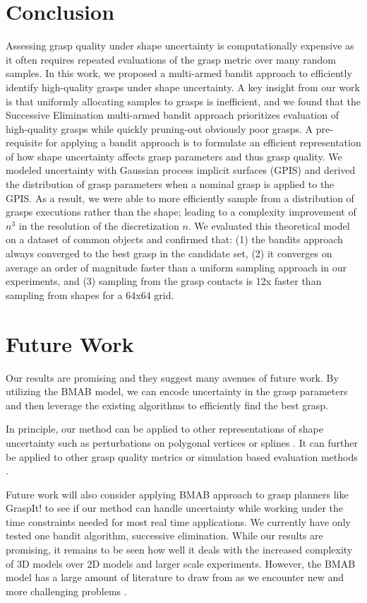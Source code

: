 \documentclass[letterpaper, 10 pt, conference]{ieeeconf}  %
\begin{document}
\section{Conclusion}
Assessing grasp quality under shape uncertainty is computationally expensive as it often requires repeated evaluations of the grasp metric over many random samples.
In this work, we proposed a multi-armed bandit approach to efficiently identify high-quality grasps under shape uncertainty. 
A key insight from our work is that uniformly allocating samples to grasps is inefficient, and
 we found that the Successive Elimination multi-armed bandit approach prioritizes evaluation of high-quality grasps while quickly pruning-out obviously poor grasps.
A pre-requisite for applying a bandit approach is to formulate an efficient representation of how shape uncertainty affects grasp parameters and thus grasp quality.
We modeled uncertainty with Gaussian process implicit surfaces (GPIS) and derived the distribution of grasp parameters when a nominal grasp is applied to the GPIS.
As a result, we were able to more efficiently sample from a distribution of grasps executions rather than the shape; leading to a complexity improvement of $n^3$ in the resolution of the discretization $n$.
We evaluated this theoretical model on a dataset of common objects and confirmed that: (1) the bandits approach always converged to the best grasp in the candidate set, (2) it converges on average an order of magnitude faster than a uniform sampling approach in our experiments, and (3) sampling from the grasp contacts is 12x faster than sampling from shapes for a 64x64 grid.



\section{Future Work}
Our results are promising and they suggest many avenues of future work. By utilizing the BMAB model, we can encode uncertainty in the grasp parameters and then leverage the existing algorithms to efficiently find the best grasp. 

In principle, our method can be applied to other representations of shape uncertainty such as perturbations on polygonal vertices \cite{kehoe2012estimating} or splines \cite{christopoulos2007handling}.
It can further be applied to other grasp quality metrics or simulation based evaluation methods \cite{73}. 

Future work will also consider applying BMAB approach to grasp planners like GraspIt! \cite{miller2004graspit} to see if our method can handle uncertainty while working under the time constraints needed for most real time applications. We currently have only tested one bandit algorithm, successive elimination. While our results are promising, it remains to be seen how well it deals with the increased complexity of 3D models over 2D models and larger scale experiments. However, the BMAB model has a large amount of literature to draw from as we encounter new and more challenging problems \cite{bergemann2006bandit}.
\end{document}
